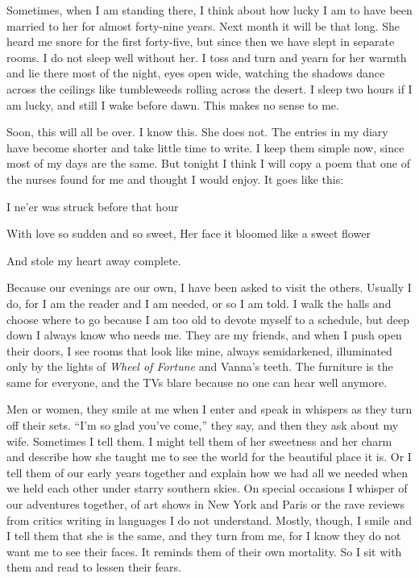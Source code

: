 \documentclass[10pt, twoside, openright]{book}
\begin{document}
Sometimes, when I am standing there, I think about how lucky I am to
have been married to her for almost forty-nine years. Next month it will
be that long. She heard me snore for the first forty-five, but since
then we have slept in separate rooms. I do not sleep well without her. I
toss and turn and yearn for her warmth and lie there most of the night,
eyes open wide, watching the shadows dance across the ceilings like
tumbleweeds rolling across the desert. I sleep two hours if I am lucky,
and still I wake before dawn. This makes no sense to me.

Soon, this will all be over. I know this. She does not. The entries in
my diary have become shorter and take little time to write. I keep them
simple now, since most of my days are the same. But tonight I think I
will copy a poem that one of the nurses found for me and thought I would
enjoy. It goes like this:


I ne'er was struck before that hour

With love so sudden and so sweet, Her face it bloomed like a sweet
flower

And stole my heart away complete.


Because our evenings are our own, I have been asked to visit the others.
Usually I do, for I am the reader and I am needed, or so I am told. I
walk the halls and choose where to go because I am too old to devote
myself to a schedule, but deep down I always know who needs me. They are
my friends, and when I push open their doors, I see rooms that look like
mine, always semidarkened, illuminated only by the lights of \emph{Wheel
of Fortune} and Vanna's teeth. The furniture is the same for everyone,
and the TVs blare because no one can hear well anymore.

Men or women, they smile at me when I enter and speak in whispers as
they turn off their sets. ``I'm so glad you've come,'' they say, and
then they ask about my wife. Sometimes I tell them. I might tell them of
her sweetness and her charm and describe how she taught me to see the
world for the beautiful place it is. Or I tell them of our early years
together and explain how we had all we needed when we held each other
under starry southern skies. On special occasions I whisper of our
adventures together, of art shows in New York and Paris or the rave
reviews from critics writing in languages I do not understand. Mostly,
though, I smile and I tell them that she is the same, and they turn from
me, for I know they do not want me to see their faces. It reminds them
of their own mortality. So I sit with them and read to lessen their
fears.
\end{document}
